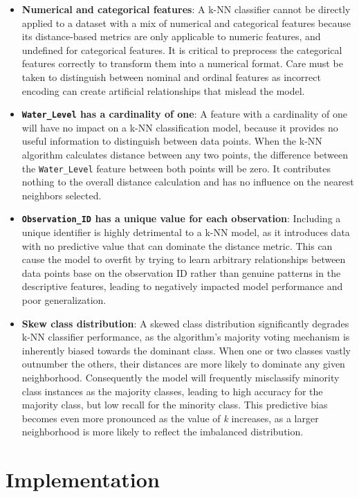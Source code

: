 \documentclass[conference]{IEEEtran}
\begin{document}
\begin{itemize}
    \item \textbf{Numerical and categorical features}: A k-NN classifier cannot be directly applied to a dataset with a mix of numerical and categorical features because its distance-based metrics are only applicable to numeric features, and undefined for categorical features. It is critical to preprocess the categorical features correctly to transform them into a numerical format. Care must be taken to distinguish between nominal and ordinal features as incorrect encoding can create artificial relationships that mislead the model.
    \item \textbf{\texttt{Water\_Level} has a cardinality of one}: A feature with a cardinality of one will have no impact on a k-NN classification model, because it provides no useful information to distinguish between data points. When the k-NN algorithm calculates distance between any two points, the difference between the \texttt{Water\_Level} feature between both points will be zero. It contributes nothing to the overall distance calculation and has no influence on the nearest neighbors selected.
    \item \textbf{\texttt{Observation\_ID} has a unique value for each observation}: Including a unique identifier is highly detrimental to a k-NN model, as it introduces data with no predictive value that can dominate the distance metric. This can cause the model to overfit by trying to learn arbitrary relationships between data points base on the observation ID rather than genuine patterns in the descriptive features, leading to negatively impacted model performance and poor generalization.
    \item \textbf{Skew class distribution}: A skewed class distribution significantly degrades k-NN classifier performance, as the algorithm's majority voting mechanism is inherently biased towards the dominant class. When one or two classes vastly outnumber the others, their distances are more likely to dominate any given neighborhood. Consequently the model will frequently misclassify minority class instances as the majority classes, leading to high accuracy for the majority class, but low recall for the minority class. This predictive bias becomes even more pronounced as the value of \textit{k} increases, as a larger neighborhood is more likely to reflect the imbalanced distribution.
\end{itemize}


\section{\textbf{Implementation}}
\end{document}
